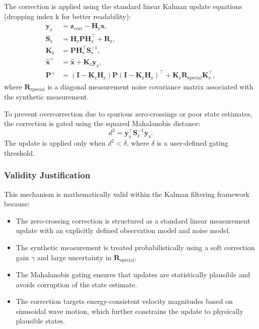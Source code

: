 \documentclass[11pt,letterpaper]{article}
\begin{document}
The correction is applied using the standard linear Kalman update equations (dropping index k for better readability):
\begin{align}
    \bm{y}_\mathrm{z} &= \bm{z}_\mathrm{\text{corr}} - \bm{H}_\mathrm{z} \bm{\hat{x}}, \\
    \bm{S}_\mathrm{z} &= \bm{H}_\mathrm{z} \bm{P} \bm{H}_\mathrm{z}^\top + \bm{R}_\mathrm{z}, \\
    \bm{K}_\mathrm{z} &= \bm{P} \bm{H}_\mathrm{z}^\top \bm{S}_\mathrm{z}^{-1}, \\
    \bm{\hat{x}}^+ &= \bm{\hat{x}} + \bm{K}_\mathrm{z} \bm{y}_\mathrm{z}, \\
    \bm{P}^+ &= (\bm{I} - \bm{K}_\mathrm{z} \bm{H}_\mathrm{z}) \bm{P} (\bm{I} - \bm{K}_\mathrm{z} \bm{H}_\mathrm{z})^\top + \bm{K}_\mathrm{z} \bm{R}_\mathrm{\text{special}} \bm{K}_\mathrm{z}^\top,
\end{align}
where $\bm{R}_\mathrm{\text{special}}$ is a diagonal measurement noise covariance matrix associated with the synthetic measurement.

To prevent overcorrection due to spurious zero-crossings or poor state estimates, the correction is gated using the squared Mahalanobis distance:
\begin{equation}
    d^2 = \bm{y}_\mathrm{z}^\top \bm{S}_\mathrm{z}^{-1} \bm{y}_\mathrm{z}.
\end{equation}
The update is applied only when $d^2 < \delta$, where $\delta$ is a user-defined gating threshold.

\subsubsection*{Validity Justification}

This mechanism is mathematically valid within the Kalman filtering framework because:

\begin{itemize}
    \item The zero-crossing correction is structured as a standard linear measurement update with an explicitly defined observation model and noise model.
    \item The synthetic measurement is treated probabilistically using a soft correction gain $\gamma$ and large uncertainty in $\bm{R}_\mathrm{\text{special}}$.
    \item The Mahalanobis gating ensures that updates are statistically plausible and avoids corruption of the state estimate.
    \item The correction targets energy-consistent velocity magnitudes based on sinusoidal wave motion, which further constrains the update to physically plausible states.
\end{itemize}
\end{document}

